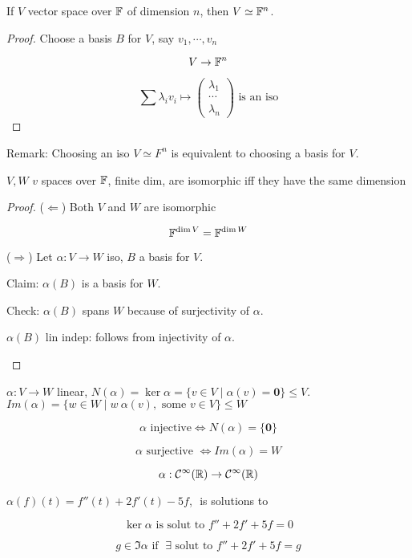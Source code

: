 \documentclass[a4paper]{article}
\begin{document}
\begin{thm} 
	If $ V $ vector space over $ \mathbb{F} $ of dimension $ n $, then $ V \simeq \mathbb{F}^{n} $.
	
\end{thm}

\begin{proof}
	Choose a basis $ B $ for $ V $, say $ v_{1},\cdots,v_{n} $
	
	\[ V \to \mathbb{F}^{n} \]
	
	\[ \sum \lambda_{i}v_{i} \mapsto \begin{pmatrix}
	\lambda_{1} \\
	\cdots \\
	\lambda_{n}
	\end{pmatrix} \text{ is an iso}\]
\end{proof}

Remark: Choosing an iso $ V \simeq F^{n} $ is equivalent to choosing a basis for $ V $.

\begin{thm} 
	$ V,W $ $ v $ spaces over $ \mathbb{F} $, finite dim, are isomorphic iff they have the same dimension
\end{thm}

\begin{proof}
	($ \Leftarrow $) Both $ V $ and $ W $ are isomorphic 
	
	\[ \mathbb{F}^{\dim V} = \mathbb{F}^{\dim W} \]
	
	($ \Rightarrow $) Let $ \alpha : V \to W $ iso, $ B $ a basis for $ V $.
	
	Claim: $ \alpha(B) $ is a basis for $ W $. 
	
	
	Check: $ \alpha(B) $ spans $ W $ because of surjectivity of $ \alpha $.
	
	\begin{ex}
		$ \alpha(B) $ lin indep: follows from injectivity of $ \alpha $.
	\end{ex}
\end{proof}

\begin{defi}
	$ \alpha : V \to W $ linear, 
	$ N(\alpha) = \ker \alpha = \{  v \in V \; | \; \alpha(v) = \mathbf{0} \} \leq V $.
	$ Im(\alpha) = \{ w \in W \; | \; w \ \alpha(v), \text{ some } v \in V  \} \leq W  $
\end{defi}

\[ \alpha \text{ injective} \iff N(\alpha) = \{ \mathbf{0} \} \]

\[ \alpha \text{ surjective } \iff Im(\alpha) = W \]

\begin{eg}
	\[ \alpha : \mathcal{C}^{\infty} (\mathbb{R}) \to \mathcal{C}^{\infty} (\mathbb{R})  \]
	
	$ \alpha(f)(t) = f''(t) + 2f'(t) - 5f  $, $  $ is solutions to
	
	\[  \ker \alpha \text{ is solut to } f'' + 2f' + 5f = 0 \]
	
	\[ g \in \Im \alpha \text{ if } \; \exists \text{ solut to } f'' + 2f' + 5f = g  \]
\end{eg}
\end{document}
